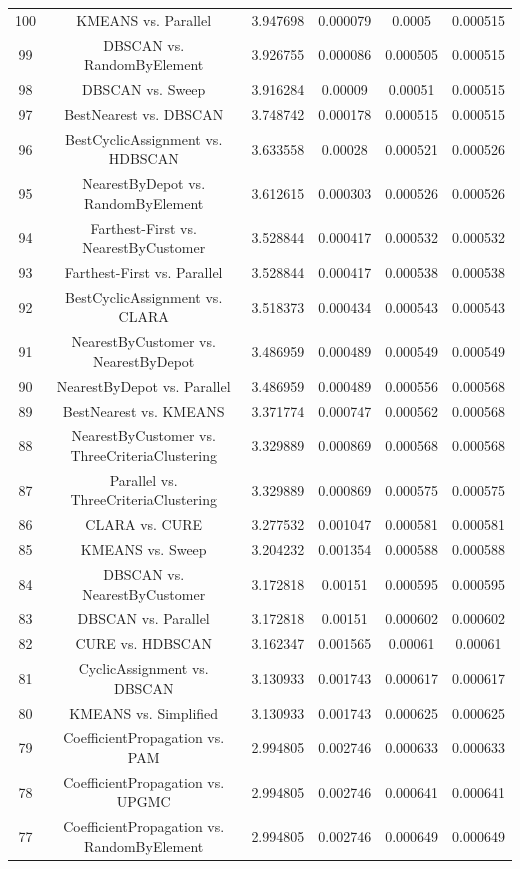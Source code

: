 \documentclass[a4paper,10pt]{article}
\begin{document}
\begin{landscape}
\begin{table}[!htp]
\begin{tabular}{cccccc}
100&KMEANS vs. Parallel&3.947698&0.000079&0.0005&0.000515\\
99&DBSCAN vs. RandomByElement&3.926755&0.000086&0.000505&0.000515\\
98&DBSCAN vs. Sweep&3.916284&0.00009&0.00051&0.000515\\
97&BestNearest vs. DBSCAN&3.748742&0.000178&0.000515&0.000515\\
96&BestCyclicAssignment vs. HDBSCAN&3.633558&0.00028&0.000521&0.000526\\
95&NearestByDepot vs. RandomByElement&3.612615&0.000303&0.000526&0.000526\\
94&Farthest-First vs. NearestByCustomer&3.528844&0.000417&0.000532&0.000532\\
93&Farthest-First vs. Parallel&3.528844&0.000417&0.000538&0.000538\\
92&BestCyclicAssignment vs. CLARA&3.518373&0.000434&0.000543&0.000543\\
91&NearestByCustomer vs. NearestByDepot&3.486959&0.000489&0.000549&0.000549\\
90&NearestByDepot vs. Parallel&3.486959&0.000489&0.000556&0.000568\\
89&BestNearest vs. KMEANS&3.371774&0.000747&0.000562&0.000568\\
88&NearestByCustomer vs. ThreeCriteriaClustering&3.329889&0.000869&0.000568&0.000568\\
87&Parallel vs. ThreeCriteriaClustering&3.329889&0.000869&0.000575&0.000575\\
86&CLARA vs. CURE&3.277532&0.001047&0.000581&0.000581\\
85&KMEANS vs. Sweep&3.204232&0.001354&0.000588&0.000588\\
84&DBSCAN vs. NearestByCustomer&3.172818&0.00151&0.000595&0.000595\\
83&DBSCAN vs. Parallel&3.172818&0.00151&0.000602&0.000602\\
82&CURE vs. HDBSCAN&3.162347&0.001565&0.00061&0.00061\\
81&CyclicAssignment vs. DBSCAN&3.130933&0.001743&0.000617&0.000617\\
80&KMEANS vs. Simplified&3.130933&0.001743&0.000625&0.000625\\
79&CoefficientPropagation vs. PAM&2.994805&0.002746&0.000633&0.000633\\
78&CoefficientPropagation vs. UPGMC&2.994805&0.002746&0.000641&0.000641\\
77&CoefficientPropagation vs. RandomByElement&2.994805&0.002746&0.000649&0.000649\\

\end{tabular}
\end{table}
\end{landscape}
\end{document}
